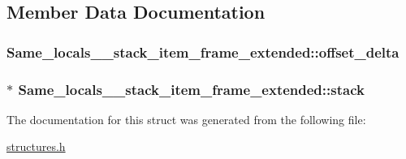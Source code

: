 \subsection{Member Data Documentation}
\subsubsection[{\texorpdfstring{offset\+\_\+delta}{offset_delta}}]{ Same\+\_\+locals\+\_\+\_\+stack\+\_\+item\+\_\+frame\+\_\+extended\+::offset\+\_\+delta}\hypertarget{structSame__locals__1__stack__item__frame__extended_af1fb0ce3ba68c6d6b49992b99a044235}{}\label{structSame__locals__1__stack__item__frame__extended_af1fb0ce3ba68c6d6b49992b99a044235}
\subsubsection[{\texorpdfstring{stack}{stack}}]{$\ast$ Same\+\_\+locals\+\_\+\_\+stack\+\_\+item\+\_\+frame\+\_\+extended\+::stack}\hypertarget{structSame__locals__1__stack__item__frame__extended_a7900584b7fadb413da796fbd30c1fa2b}{}\label{structSame__locals__1__stack__item__frame__extended_a7900584b7fadb413da796fbd30c1fa2b}


The documentation for this struct was generated from the following file\+:\begin{DoxyCompactItemize}
\item 
\hyperlink{structures_8h}{structures.\+h}\end{DoxyCompactItemize}
